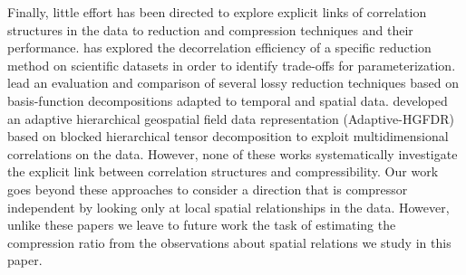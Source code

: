 \documentclass[conference]{IEEEtran}
\begin{document}


Finally, little effort has been directed to explore explicit links of correlation structures in the data to reduction and compression techniques and their  performance. 
\cite{lindstrom2014} has explored the decorrelation efficiency of a specific reduction method on scientific datasets in order to identify trade-offs for parameterization. 
\cite{moon2017} lead an evaluation and comparison of several lossy reduction techniques  based on  basis-function decompositions adapted  to temporal and spatial data. 
\cite{yu2021} developed an adaptive hierarchical geospatial field data representation
(Adaptive-HGFDR) based on blocked hierarchical
tensor decomposition to exploit multidimensional correlations on the data. However, none of these works systematically investigate the explicit link between correlation structures and compressibility. 
Our work goes beyond these approaches to consider a direction that is compressor independent by looking only at local spatial relationships in the data.
However, unlike these papers we leave to future work the task of estimating the compression ratio from the observations about spatial relations we study in this paper.
\end{document}

